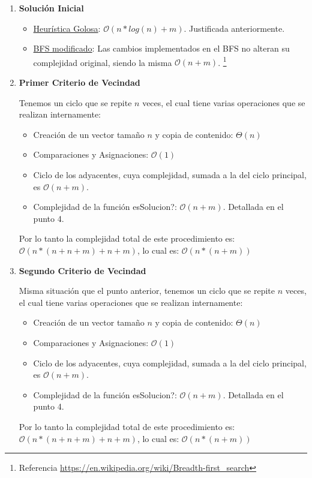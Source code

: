 \begin{enumerate}
  \item \textbf{Solución Inicial}
    \begin{itemize}
    	\item \underline{Heurística Golosa}: $\mathcal{O}(n*log(n) + m)$. Justificada anteriormente.
        \item \underline{BFS modificado}: Las cambios implementados en el BFS no alteran su complejidad original, siendo la misma $\mathcal{O}(n + m)$. \footnote{Referencia \url{https://en.wikipedia.org/wiki/Breadth-first_search}}
    \end{itemize}
  \item \textbf{Primer Criterio de Vecindad}

  Tenemos un ciclo que se repite $n$ veces, el cual tiene varias operaciones que se realizan internamente:
  \begin{itemize}
    \item Creación de un vector tamaño $n$ y copia de contenido: $\Theta{(n)}$
    \item Comparaciones y Asignaciones: $\mathcal{O}(1)$
    \item Ciclo de los adyacentes, cuya complejidad, sumada a la del ciclo principal, es $\mathcal{O}(n + m)$.
    \item Complejidad de la función esSolucion?: $\mathcal{O}(n + m)$. Detallada en el punto 4.
  \end{itemize}
  Por lo tanto la complejidad total de este procedimiento es: $\mathcal{O}(n*(n + n + m) + n + m)$, lo cual es: $\mathcal{O}(n*(n + m))$

  \item \textbf{Segundo Criterio de Vecindad}

    Misma situación que el punto anterior, tenemos un ciclo que se repite $n$ veces, el cual tiene varias operaciones que se realizan internamente:
  \begin{itemize}
    \item Creación de un vector tamaño $n$ y copia de contenido: $\Theta{(n)}$
    \item Comparaciones y Asignaciones: $\mathcal{O}(1)$
    \item Ciclo de los adyacentes, cuya complejidad, sumada a la del ciclo principal, es $\mathcal{O}(n + m)$.
    \item Complejidad de la función esSolucion?: $\mathcal{O}(n + m)$. Detallada en el punto 4.
  \end{itemize}
  Por lo tanto la complejidad total de este procedimiento es: $\mathcal{O}(n*(n + n + m) + n + m)$, lo cual es: $\mathcal{O}(n*(n + m))$


\end{enumerate}
